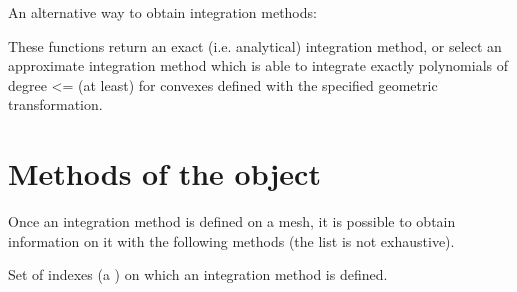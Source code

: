 \documentclass[a4paper,11pt,english]{sphinxmanual}
\begin{document}
An alternative way to obtain integration methods:

\begin{sphinxVerbatim}[commandchars=\\\{\}]
  
   

  
     
\end{sphinxVerbatim}

These functions return an exact (i.e. analytical) integration method, or select an
approximate integration method which is able to integrate exactly polynomials of
degree \textless{}=  (at least) for convexes defined with the specified geometric
transformation.


\section{Methods of the  object}
\label{\detokenize{userdoc/binteg:methods-of-the-mim-object}}
Once an integration method is defined on a mesh, it is possible to obtain
information on it with the following methods (the list is not exhaustive).

\begin{fulllineitems}
\label{\detokenize{userdoc/binteg:mim.convex_index}}
Set of indexes (a ) on which an integration method is defined.

\end{fulllineitems}

\end{document}
